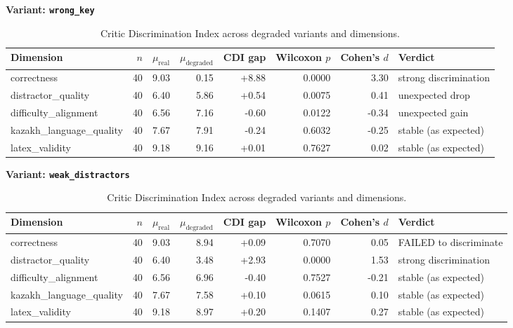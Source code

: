 \begin{table}[t]
\centering
\caption{Critic Discrimination Index across degraded variants and dimensions.}
\label{tab:cdi}
\vspace{0.5em}
\textbf{Variant: \texttt{wrong_key}}\\
\begin{tabular}{lrrrrrrl}
\hline
Dimension & $n$ & $\mu_\text{real}$ & $\mu_\text{degraded}$ & CDI gap & Wilcoxon $p$ & Cohen's $d$ & Verdict \\
\hline
correctness & 40 & 9.03 & 0.15 & +8.88 & 0.0000 & 3.30 & strong discrimination \\
distractor\_quality & 40 & 6.40 & 5.86 & +0.54 & 0.0075 & 0.41 & unexpected drop \\
difficulty\_alignment & 40 & 6.56 & 7.16 & -0.60 & 0.0122 & -0.34 & unexpected gain \\
kazakh\_language\_quality & 40 & 7.67 & 7.91 & -0.24 & 0.6032 & -0.25 & stable (as expected) \\
latex\_validity & 40 & 9.18 & 9.16 & +0.01 & 0.7627 & 0.02 & stable (as expected) \\
\hline
\end{tabular}
\vspace{0.5em}
\textbf{Variant: \texttt{weak_distractors}}\\
\begin{tabular}{lrrrrrrl}
\hline
Dimension & $n$ & $\mu_\text{real}$ & $\mu_\text{degraded}$ & CDI gap & Wilcoxon $p$ & Cohen's $d$ & Verdict \\
\hline
correctness & 40 & 9.03 & 8.94 & +0.09 & 0.7070 & 0.05 & FAILED to discriminate \\
distractor\_quality & 40 & 6.40 & 3.48 & +2.93 & 0.0000 & 1.53 & strong discrimination \\
difficulty\_alignment & 40 & 6.56 & 6.96 & -0.40 & 0.7527 & -0.21 & stable (as expected) \\
kazakh\_language\_quality & 40 & 7.67 & 7.58 & +0.10 & 0.0615 & 0.10 & stable (as expected) \\
latex\_validity & 40 & 9.18 & 8.97 & +0.20 & 0.1407 & 0.27 & stable (as expected) \\
\hline
\end{tabular}
\end{table}
